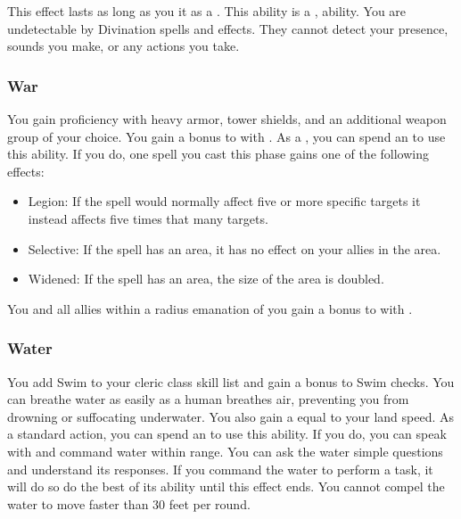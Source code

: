             This effect lasts as long as you  it as a .
            This ability is a ,  ability.
             You are undetectable by Divination spells and effects.
            They cannot detect your presence, sounds you make, or any actions you take.

        \subsubsection{War}
             You gain proficiency with heavy armor, tower shields, and an additional weapon group of your choice.
             You gain a  bonus to  with .
             As a , you can spend an  to use this ability.
            If you do, one spell you cast this phase gains one of the following effects:
            \begin{itemize}
                \item Legion: If the spell would normally affect five or more specific targets it instead affects five times that many targets.
                \item Selective: If the spell has an area, it has no effect on your allies in the area.
                \item Widened: If the spell has an area, the size of the area is doubled.
            \end{itemize}
             You and all allies within a \arealarge radius emanation of you gain a  bonus to  with .

        \subsubsection{Water}
             You add Swim to your cleric class skill list and gain a  bonus to Swim checks.
             You can breathe water as easily as a human breathes air, preventing you from drowning or suffocating underwater.
            You also gain a  equal to your land speed.
             As a standard action, you can spend an  to use this ability.
            If you do, you can speak with and command water within range.
            You can ask the water simple questions and understand its responses.
            If you command the water to perform a task, it will do so do the best of its ability until this effect ends.
            You cannot compel the water to move faster than 30 feet per round.

